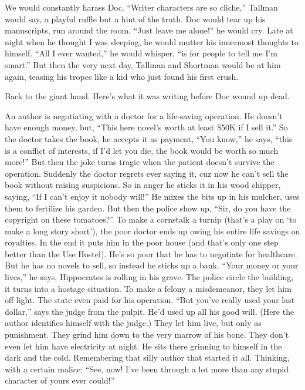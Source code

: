 \documentclass[oneside]{book}
\begin{document}
We would constantly harass Doc.  ``Writer characters are so cliche,''
Tallman would say, a playful ruffle but a hint of the truth.
Doc would tear up his manuscripts, run around the room.  ``Just leave me
alone!'' he would cry.  Late at night when he thought I was sleeping,
he would mutter his innermost thoughts to himself.  ``All I ever wanted,''
he would whisper, ``is for people to tell me I'm smart.''  But then the
very next day, Tallman and Shortman would be at him again, teasing his
tropes like a kid who just found his first crush.

Back to the giant hand.  Here's what it was writing before Doc wound up
dead.

An author is negotiating with a doctor for a life-saving operation.
He doesn't have enough money, but, ``This here novel's worth at least
\$50K if I sell it.''  So the doctor takes the book, he accepts it as
payment, ``You know,'' he says, ``this is a conflict of interests, if
I'd let you die, the book would be worth so much more!''  But then the
joke turns tragic when the patient doesn't survive the operation.
Suddenly the doctor regrets ever saying it, cuz now he can't sell the
book without raising suspicions.  So in anger he sticks it in his
wood chipper, saying, ``If I can't enjoy it nobody will!''  He mixes
the bits up in his mulcher, uses them to fertilize his garden.  But
then the police show up, ``Sir, do you have the copyright on these
tomatoes?''  To make a cornstalk a turnip (that's a play on `to make
a long story short'), the poor doctor ends up owing his entire life
savings on royalties.  In the end it puts him in the poor house (and
that's only one step better than the Use Hostel).  He's so poor that
he has to negotiate for healthcare.  But he has no novels to sell, so
instead he sticks up a bank.  ``Your money or your lives,'' he says,
Hippocrates is rolling in his grave.  The police circle the building,
it turns into a hostage situation.  To make a felony a misdemeanor,
they let him off light.  The state even paid for his operation.
``But you've really used your last dollar,'' says the judge from the
pulpit.  He'd used up all his good will.  (Here the author identifies
himself with the judge.)  They let him live, but only as punishment.
They grind him down to the very marrow of his bone.  They don't even
let him have electricity at night.  He sits there grinning to
himself in the dark and the cold.  Remembering that silly author that started it
all.  Thinking, with a certain malice:  ``See, now!  I've been through
a lot more than any stupid character of yours ever could!''
\end{document}
